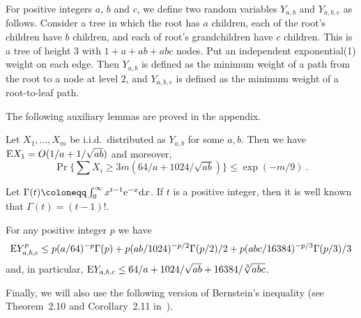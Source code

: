 \documentclass{patmorin}
\DeclareMathOperator{\erlang}{Erlang}
\newcommand{\abas}[1]{\textcolor{orange}{\big[Abbas: #1\big]}}
\begin{document}

For positive integers $a$, $b$ and $c$, we define two random variables $Y_{a,b}$  and $Y_{a,b,c}$ as follows.
Consider a tree in which the root has $a$ children,
 each of the root's children have $b$ children,
and each of root's grandchildren have $c$ children.
This is a tree of height 3 with
$1 + a + ab + abc$ nodes. 
Put an independent exponential(1) weight on each edge.
Then $Y_{a,b}$ is defined as the minimum weight of a path from the root to a node at level 2,
and $Y_{a,b,c}$ is defined as the minimum weight of a root-to-leaf path.

The following auxiliary lemmas are proved in the appendix.

\begin{lem}
Let $X_1,\dots,X_m$ be i.i.d.\ distributed as $Y_{a,b}$ for some $a,b$.
Then we have
$\mathrm{E} X_1 =O(1/a+1/\sqrt{ab})$ and moreover,
\[
\Pr\{\sum X_i \geq 3 m (64/a + 1024/\sqrt{ab}) \}
\leq
\exp(-m/9)\:.
\]
\end{lem}

Let 
$\Gamma(t) \coloneqq \int_0^\infty x^{t-1} {\rm e}^{-x} \mathrm{d} x$.
If $t$ is a positive integer, then it is well known that $\Gamma(t)=(t-1)!$.

\begin{lem}
For any positive integer $p$ we have
\[
\mathrm{E} Y_{a,b,c}^p \leq
 p (a/64)^{-p}\Gamma(p)
+ p(ab/1024)^{-p/2}\Gamma(p/2)/2
+ p(abc/16384)^{-p/3}\Gamma(p/3)/3
\]
and, in particular,
$\mathrm{E} Y_{a,b,c} \leq 64/a+1024/\sqrt{ab} + 16384/\sqrt[3]{abc}$.
\end{lem}

Finally, we will also use the following
version of Bernstein's inequality (see Theorem~2.10 and Corollary~2.11 in~\cite{boucheron2013concentration}).

\end{document}
